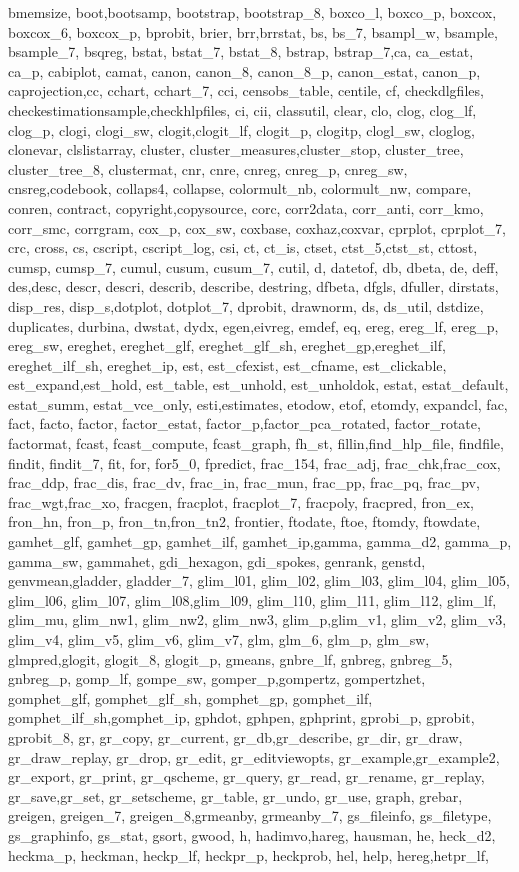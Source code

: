 {{bmemsize, boot,bootsamp, bootstrap, bootstrap_8, boxco_l, boxco_p, boxcox, boxcox_6, boxcox_p, bprobit, brier, brr,brrstat, bs, bs_7, bsampl_w, bsample, bsample_7, bsqreg, bstat, bstat_7, bstat_8, bstrap, bstrap_7,ca, ca_estat, ca_p, cabiplot, camat, canon, canon_8, canon_8_p, canon_estat, canon_p, caprojection,cc, cchart, cchart_7, cci, censobs_table, centile, cf, checkdlgfiles, checkestimationsample,checkhlpfiles, ci, cii, classutil, clear, clo, clog, clog_lf, clog_p, clogi, clogi_sw, clogit,clogit_lf, clogit_p, clogitp, clogl_sw, cloglog, clonevar, clslistarray, cluster, cluster_measures,cluster_stop, cluster_tree, cluster_tree_8, clustermat, cnr, cnre, cnreg, cnreg_p, cnreg_sw, cnsreg,codebook, collaps4, collapse, colormult_nb, colormult_nw, compare, conren, contract, copyright,copysource, corc, corr2data, corr_anti, corr_kmo, corr_smc, corrgram, cox_p, cox_sw, coxbase, coxhaz,coxvar, cprplot, cprplot_7, crc, cross, cs, cscript, cscript_log, csi, ct, ct_is, ctset, ctst_5,ctst_st, cttost, cumsp, cumsp_7, cumul, cusum, cusum_7, cutil, d, datetof, db, dbeta, de, deff, des,desc, descr, descri, describ, describe, destring, dfbeta, dfgls, dfuller, dirstats, disp_res, disp_s,dotplot, dotplot_7, dprobit, drawnorm, ds, ds_util, dstdize, duplicates, durbina, dwstat, dydx, egen,eivreg, emdef, eq, ereg, ereg_lf, ereg_p, ereg_sw, ereghet, ereghet_glf, ereghet_glf_sh, ereghet_gp,ereghet_ilf, ereghet_ilf_sh, ereghet_ip, est, est_cfexist, est_cfname, est_clickable, est_expand,est_hold, est_table, est_unhold, est_unholdok, estat, estat_default, estat_summ, estat_vce_only, esti,estimates, etodow, etof, etomdy, expandcl, fac, fact, facto, factor, factor_estat, factor_p,factor_pca_rotated, factor_rotate, factormat, fcast, fcast_compute, fcast_graph, fh_st, fillin,find_hlp_file, findfile, findit, findit_7, fit, for, for5_0, fpredict, frac_154, frac_adj, frac_chk,frac_cox, frac_ddp, frac_dis, frac_dv, frac_in, frac_mun, frac_pp, frac_pq, frac_pv, frac_wgt,frac_xo, fracgen, fracplot, fracplot_7, fracpoly, fracpred, fron_ex, fron_hn, fron_p, fron_tn,fron_tn2, frontier, ftodate, ftoe, ftomdy, ftowdate, gamhet_glf, gamhet_gp, gamhet_ilf, gamhet_ip,gamma, gamma_d2, gamma_p, gamma_sw, gammahet, gdi_hexagon, gdi_spokes, genrank, genstd, genvmean,gladder, gladder_7, glim_l01, glim_l02, glim_l03, glim_l04, glim_l05, glim_l06, glim_l07, glim_l08,glim_l09, glim_l10, glim_l11, glim_l12, glim_lf, glim_mu, glim_nw1, glim_nw2, glim_nw3, glim_p,glim_v1, glim_v2, glim_v3, glim_v4, glim_v5, glim_v6, glim_v7, glm, glm_6, glm_p, glm_sw, glmpred,glogit, glogit_8, glogit_p, gmeans, gnbre_lf, gnbreg, gnbreg_5, gnbreg_p, gomp_lf, gompe_sw, gomper_p,gompertz, gompertzhet, gomphet_glf, gomphet_glf_sh, gomphet_gp, gomphet_ilf, gomphet_ilf_sh,gomphet_ip, gphdot, gphpen, gphprint, gprobi_p, gprobit, gprobit_8, gr, gr_copy, gr_current, gr_db,gr_describe, gr_dir, gr_draw, gr_draw_replay, gr_drop, gr_edit, gr_editviewopts, gr_example,gr_example2, gr_export, gr_print, gr_qscheme, gr_query, gr_read, gr_rename, gr_replay, gr_save,gr_set, gr_setscheme, gr_table, gr_undo, gr_use, graph, grebar, greigen, greigen_7, greigen_8,grmeanby, grmeanby_7, gs_fileinfo, gs_filetype, gs_graphinfo, gs_stat, gsort, gwood, h, hadimvo,hareg, hausman, he, heck_d2, heckma_p, heckman, heckp_lf, heckpr_p, heckprob, hel, help, hereg,hetpr_lf, }}
